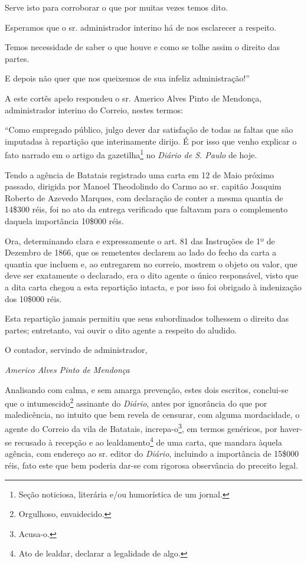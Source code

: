Serve isto para corroborar o que por muitas vezes temos dito.

Esperamos que o sr. administrador interino há de nos esclarecer a
respeito.

Temos necessidade de saber o que houve e como se tolhe assim o direito
das partes.

E depois não quer que nos queixemos de sua infeliz administração!''

A este cortês apelo respondeu o sr. Americo Alves Pinto de Mendonça,
administrador interino do Correio, nestes termos:

``Como empregado público, julgo dever dar satisfação de todas as faltas
que são imputadas à repartição que interinamente dirijo. É por isso que
venho explicar o fato narrado em o artigo da gazetilha\footnote{Seção
  noticiosa, literária e/ou humorística de um jornal.} no \emph{Diário
de S. Paulo} de hoje.

Tendo a agência de Batatais registrado uma carta em 12 de Maio próximo
passado, dirigida por Manoel Theodolindo do Carmo ao sr. capitão Joaquim
Roberto de Azevedo Marques, com declaração de conter a mesma quantia de
14\$300 réis, foi no ato da entrega verificado que faltavam para o
complemento daquela importância 10\$000 réis.

Ora, determinando clara e expressamente o art. 81 das Instruções de 1º
de Dezembro de 1866, que os remetentes declarem ao lado do fecho da
carta a quantia que incluem e, ao entregarem no correio, mostrem o
objeto ou valor, que deve ser exatamente o declarado, era o dito agente
o único responsável, visto que a dita carta chegou a esta repartição
intacta, e por isso foi obrigado à indenização dos 10\$000 réis.

Esta repartição jamais permitiu que seus subordinados tolhessem o
direito das partes; entretanto, vai ouvir o dito agente a respeito do
aludido.

O contador, servindo de administrador,

\emph{Americo Alves Pinto de Mendonça}

Analisando com calma, e sem amarga prevenção, estes dois escritos,
conclui-se que o intumescido\footnote{Orgulhoso, envaidecido.}
assinante do \emph{Diário}, antes por ignorância do que por
maledicência, no intuito que bem revela de censurar, com alguma
mordacidade, o agente do Correio da vila de Batatais,
increpa-o\footnote{Acusa-o.}, em termos genéricos, por haver-se
recusado à recepção e ao lealdamento\footnote{Ato de lealdar, declarar
  a legalidade de algo.} de uma carta, que mandara àquela agência, com
endereço ao sr. editor do \emph{Diário}, incluindo a importância de
15\$000 réis, fato este que bem poderia dar-se com rigorosa observância
do preceito legal.

